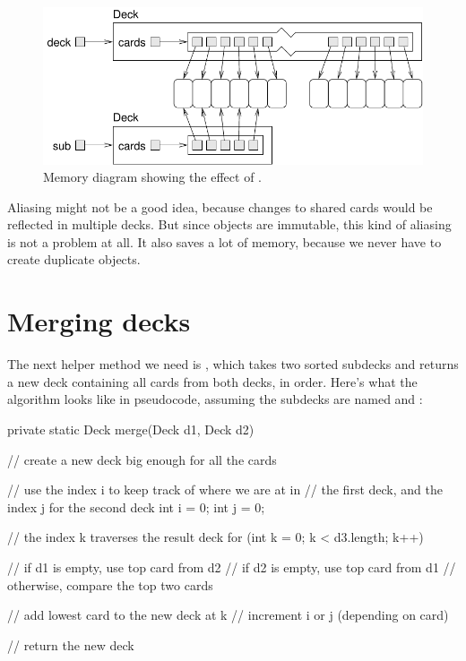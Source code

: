 \begin{figure}[!ht]
\begin{center}
\includegraphics{figs/subdeck.pdf}
\caption{Memory diagram showing the effect of .}
\label{fig.subdeck}
\end{center}
\end{figure}


Aliasing might not be a good idea, because changes to shared cards would be reflected in multiple decks.
But since  objects are immutable, this kind of aliasing is not a problem at all.
It also saves a lot of memory, because we never have to create duplicate  objects.


\section{Merging decks}


The next helper method we need is , which takes two sorted subdecks and returns a new deck containing all cards from both decks, in order.
Here's what the algorithm looks like in pseudocode, assuming the subdecks are named  and :

\begin{code}
private static Deck merge(Deck d1, Deck d2) {
    // create a new deck big enough for all the cards

    // use the index i to keep track of where we are at in
    // the first deck, and the index j for the second deck
    int i = 0;
    int j = 0;

    // the index k traverses the result deck
    for (int k = 0; k < d3.length; k++) {

        // if d1 is empty, use top card from d2
        // if d2 is empty, use top card from d1
        // otherwise, compare the top two cards

        // add lowest card to the new deck at k
        // increment i or j (depending on card)
    }
    // return the new deck
}
\end{code}

